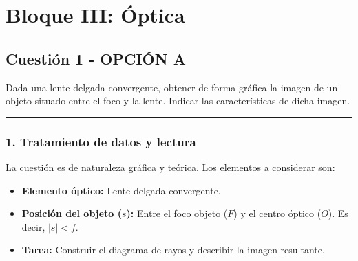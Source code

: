 \section{Bloque III: Óptica}
\label{sec:optica_2000_jun_ord}

\subsection{Cuestión 1 - OPCIÓN A}
\label{subsec:3A_2000_jun_ord}

\begin{cajaenunciado}
Dada una lente delgada convergente, obtener de forma gráfica la imagen de un objeto situado entre el foco y la lente. Indicar las características de dicha imagen.
\end{cajaenunciado}
\hrule

\subsubsection*{1. Tratamiento de datos y lectura}
La cuestión es de naturaleza gráfica y teórica. Los elementos a considerar son:
\begin{itemize}
    \item \textbf{Elemento óptico:} Lente delgada convergente.
    \item \textbf{Posición del objeto ($s$):} Entre el foco objeto ($F$) y el centro óptico ($O$). Es decir, $|s| < f$.
    \item \textbf{Tarea:} Construir el diagrama de rayos y describir la imagen resultante.
\end{itemize}

